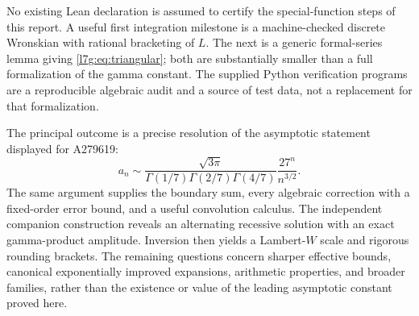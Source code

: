 \documentclass[11pt,letterpaper]{article}
\theoremstyle{remark}\newtheorem{remark}[theorem]{Remark}
\newcounter{l7gtrsavedeq}
\begin{document}
No existing Lean declaration is assumed to certify the special-function
steps of this report. A useful first integration milestone is a
machine-checked discrete Wronskian with rational bracketing of $L$.
The next is a generic formal-series lemma giving
\eqref{l7g:eq:triangular}; both are substantially smaller than a full
formalization of the gamma constant. The supplied Python verification
programs are a reproducible algebraic audit and a source of test data,
not a replacement for that formalization.

The principal outcome is a precise resolution of the asymptotic
statement displayed for A279619:
\[
 \boxed{\displaystyle
 a_n\sim\frac{\sqrt{3\pi}}{\Gamma(1/7)\Gamma(2/7)\Gamma(4/7)}
                    \frac{27^n}{n^{3/2}}.}
\]
The same argument supplies the boundary sum, every algebraic correction
with a fixed-order error bound, and a useful convolution calculus.
The independent companion construction reveals an alternating
recessive solution with an exact gamma-product amplitude. Inversion
then yields a Lambert-$W$ scale and rigorous rounding brackets. The
remaining questions concern sharper effective bounds, canonical
exponentially improved expansions, arithmetic properties, and broader
families, rather than the existence or value of the leading asymptotic
constant proved here.
\end{document}
